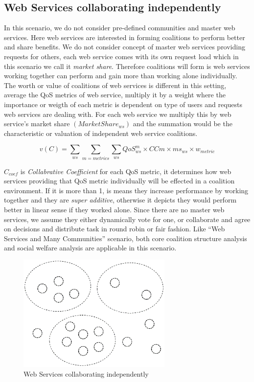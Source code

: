 \documentclass[10pt, conference, compsocconf]{IEEEtran}
\theoremstyle{plain}
\theoremstyle{definition}
\begin{document}
\subsection {Web Services collaborating independently}

In this scenario, we do not consider pre-defined communities and master web services. Here web services are interested in forming coalitions to perform better and share benefits. We do not consider concept of master web services providing requests for others, each web service comes with its own request load which in this scenario we call it \emph{market share}. Therefore coalitions will form is web services working together can perform and gain more than working alone individually. The worth or value of coalitions of web services is different in this setting, average the QoS metrics of web service, multiply it by a weight where the importance or weigth of each metric is dependent on type of users and requests web services are dealing with. For each web service we multiply this by web service's market share $(MarketShare_{ws})$ and the summation would be the characteristic or valuation of independent web service coalitions.

\begin{equation*}
v(C) = \sum_{ws}{\sum_{m=metrics}{\sum_{ws}{QoS^m_{ws} \times CC{m} \times ms_{ws}} \times w_{metric} } }
\end{equation*} 

$C_{coef}$ is \emph{Collabrative Coefficient} for each QoS metric, it determines how web services providing that QoS metric individually will be effected in a coalition environment. If it is more than 1, is means they increase performance by working together and they are \emph{super additive}, otherwise it depicts they would perform better in linear sense if they worked alone. Since there are no master web services, we assume they either dynamically vote for one, or collaborate and agree on decisions and distribute task in round robin or fair fashion. Like ``Web Services and Many Communities'' scenario, both core coalition structure analysis and social welfare analysis are applicable in this scenario.

\begin{figure}[!t]
\centering
\includegraphics[width=3in]{s3.eps}
\caption{Web Services collaborating independently}
\label{fig_sim}
\end{figure}
\end{document}
